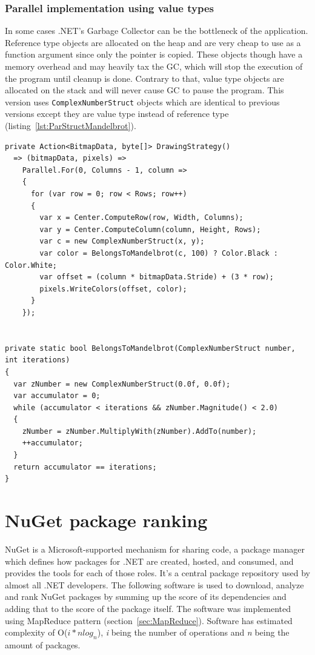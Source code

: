 \subsubsection{Parallel implementation using value types}

In some cases .NET's Garbage Collector can be the bottleneck of the application. Reference type objects are allocated on the heap and are very cheap to use as a function argument since only the pointer is copied. These objects though have a memory overhead and may heavily tax the GC, which will stop the execution of the program until cleanup is done. Contrary to that, value type objects are allocated on the stack and will never cause GC to pause the program. This version uses \texttt{ComplexNumberStruct} objects which are identical to previous versions except they are value type instead of reference type (listing~\ref{lst:ParStructMandelbrot}).

\begin{lstlisting}[style=sharpcstyle, caption={Parallel \texttt{Mandelbrot} algorithm using value types}, label={lst:ParStructMandelbrot},
numbers=none, xleftmargin=0pt,framexleftmargin=0pt,framexrightmargin=0pt,framexbottommargin=0pt]
private Action<BitmapData, byte[]> DrawingStrategy()
  => (bitmapData, pixels) =>
    Parallel.For(0, Columns - 1, column =>
    {
      for (var row = 0; row < Rows; row++)
      {
        var x = Center.ComputeRow(row, Width, Columns);
        var y = Center.ComputeColumn(column, Height, Rows);
        var c = new ComplexNumberStruct(x, y);
        var color = BelongsToMandelbrot(c, 100) ? Color.Black : Color.White;
        var offset = (column * bitmapData.Stride) + (3 * row);
        pixels.WriteColors(offset, color);
      }
    });


private static bool BelongsToMandelbrot(ComplexNumberStruct number, int iterations)
{
  var zNumber = new ComplexNumberStruct(0.0f, 0.0f);
  var accumulator = 0;
  while (accumulator < iterations && zNumber.Magnitude() < 2.0)
  {
    zNumber = zNumber.MultiplyWith(zNumber).AddTo(number);
    ++accumulator;
  }
  return accumulator == iterations;
}

\end{lstlisting}


\section{NuGet package ranking} 
\label{sec: NuGetImp}
NuGet is a Microsoft-supported mechanism for sharing code, a package manager which defines how packages for .NET are created, hosted, and consumed, and provides the tools for each of those roles. It's a central package repository used by almost all .NET developers. The following software is used to download, analyze and rank NuGet packages by summing up the score of its dependencies and adding that to the score of the package itself. The software was implemented using MapReduce pattern (section~\ref{sec:MapReduce}). Software has estimated complexity of O($i*nlog_n$), \emph{i} being the number of operations and \emph{n} being the amount of packages. 

